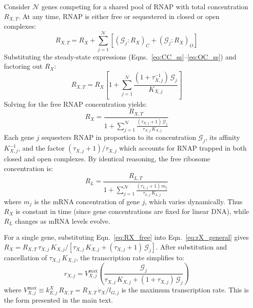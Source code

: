 Consider $\mathcal{N}$ genes competing for a shared pool of RNAP with total concentration $R_{X,T}$. At any time, RNAP is either free or sequestered in closed or open complexes:
\begin{equation}
R_{X,T} = R_X + \sum_{j=1}^{\mathcal{N}} \left[(\mathcal{G}_j : R_X)_C + (\mathcal{G}_j : R_X)_O\right]
\label{eq:RNAP_balance}
\end{equation}
Substituting the steady-state expressions (Eqns.~\ref{eq:CC_ss}--\ref{eq:OC_ss}) and factoring out $R_X$:
\begin{equation}
R_{X,T} = R_X\left[1 + \sum_{j=1}^{\mathcal{N}} \frac{(1 + \tau_{X,j}^{-1})\,\mathcal{G}_j}{K_{X,j}}\right]
\label{eq:RNAP_balance_expanded}
\end{equation}
Solving for the free RNAP concentration yields:
\begin{equation}
\boxed{R_X = \frac{R_{X,T}}{1 + \displaystyle\sum_{j=1}^{\mathcal{N}} \frac{(\tau_{X,j} + 1)\,\mathcal{G}_j}{\tau_{X,j}\,K_{X,j}}}}
\label{eq:RX_free}
\end{equation}
Each gene $j$ sequesters RNAP in proportion to its concentration $\mathcal{G}_j$, its affinity $K_{X,j}^{-1}$, and the factor $(\tau_{X,j}+1)/\tau_{X,j}$ which accounts for RNAP trapped in both closed and open complexes. By identical reasoning, the free ribosome concentration is:
\begin{equation}
\boxed{R_L = \frac{R_{L,T}}{1 + \displaystyle\sum_{j=1}^{\mathcal{N}} \frac{(\tau_{L,j} + 1)\,m_j}{\tau_{L,j}\,K_{L,j}}}}
\label{eq:RL_free}
\end{equation}
where $m_j$ is the mRNA concentration of gene $j$, which varies dynamically. Thus $R_X$ is constant in time (since gene concentrations are fixed for linear DNA), while $R_L$ changes as mRNA levels evolve.

For a single gene, substituting Eqn.~\ref{eq:RX_free} into Eqn.~\ref{eq:rX_general} gives $R_X = R_{X,T}\,\tau_{X,j}\,K_{X,j} / [\tau_{X,j}\,K_{X,j} + (\tau_{X,j}+1)\,\mathcal{G}_j]$. After substitution and cancellation of $\tau_{X,j}\,K_{X,j}$, the transcription rate simplifies to:
\begin{equation}
r_{X,j} = V_{X,j}^{\max}\left(\frac{\mathcal{G}_j}{\tau_{X,j}\,K_{X,j} + (1 + \tau_{X,j})\,\mathcal{G}_j}\right)
\label{eq:rX_Vmax}
\end{equation}
where $V_{X,j}^{\max} \equiv k_{E,j}^X\,R_{X,T} = R_{X,T}\,\dot{v}_X/l_{G,j}$ is the maximum transcription rate. This is the form presented in the main text.

